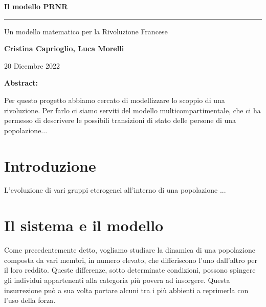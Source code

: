 \begin{center}
	\huge \textbf{Il modello PRNR}
	
	\rule{7cm}{0.4pt} 
	
	\LARGE Un modello matematico per la Rivoluzione Francese
	
	\vspace{20pt}
	
	\LARGE \textbf{Cristina Caprioglio, Luca Morelli}
	
	\vspace{5pt}
	
	\LARGE 20 Dicembre 2022
	
	\vspace{20pt}
 
	\normalsize\textbf{Abstract:}\\
\end{center}
Per questo progetto abbiamo cercato di modellizzare lo scoppio di una rivoluzione. Per farlo ci siamo serviti del modello multicompartimentale, che ci ha permesso di descrivere le possibili transizioni di stato delle persone di una popolazione...

\vspace{20pt}

\section*{Introduzione}
L'evoluzione di vari gruppi eterogenei all'interno di una popolazione ...
\section{Il sistema e il modello}
Come precedentemente detto, vogliamo studiare la dinamica di una popolazione composta da vari membri, in numero elevato, che differiscono l'uno dall'altro per il loro reddito. Queste differenze, sotto determinate condizioni, possono spingere gli individui appartenenti alla categoria più povera ad insorgere. Questa insurrezione può a sua volta portare alcuni tra i più abbienti a reprimerla con l'uso della forza.\\

